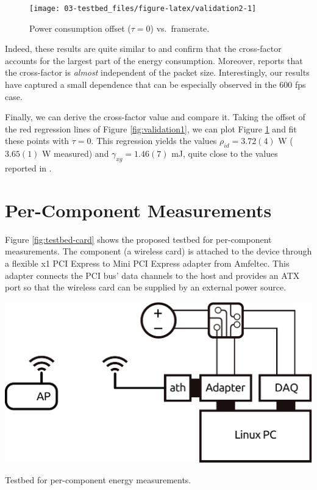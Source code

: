 \documentclass[twoside,nohyper]{tufte-book}
\theoremstyle{definition}
\theoremstyle{definition}
\theoremstyle{definition}
\theoremstyle{remark}
\begin{document}
\begin{figure}[b]

{\centering \texttt{[image: 03-testbed\_files/figure-latex/validation2-1]} 

}

\caption[Power consumption offset (\(\tau=0\)) vs.~framerate.]{Power consumption offset (\(\tau=0\)) vs.~framerate.}\label{fig:validation2}
\end{figure}

Indeed, these results are quite similar to \citet{Serrano2014} and
confirm that the cross-factor accounts for the largest part of the
energy consumption. Moreover, \citet{Serrano2014} reports that the
cross-factor is \emph{almost} independent of the packet size.
Interestingly, our results have captured a small dependence that can be
especially observed in the 600 fps case.

Finally, we can derive the cross-factor value and compare it. Taking the
offset of the red regression lines of Figure \ref{fig:validation1}, we
can plot Figure \ref{fig:validation2} and fit these points with
\(\tau=0\). This regression yields the values \(\rho_{id}=3.72(4)\) W
(\(3.65(1)\) W measured) and \(\gamma_{xg}=1.46(7)\) mJ, quite close to
the values reported in \citet{Serrano2014}.

\hypertarget{per-component-measurements}{%
\section{Per-Component Measurements}\label{per-component-measurements}}

Figure \ref{fig:testbed-card} shows the proposed testbed for
per-component measurements. The component (a wireless card) is attached
to the device through a flexible x1 PCI Express to Mini PCI Express
adapter from Amfeltec. This adapter connects the PCI bus' data channels
to the host and provides an ATX port so that the wireless card can be
supplied by an external power source.



\begin{marginfigure}

{\centering \includegraphics[width=1\linewidth]{img/03/testbed-card} 

}

\caption[Testbed for per-component energy measurements.]{Testbed for per-component energy measurements.}\label{fig:testbed-card}
\end{marginfigure}
\end{document}
